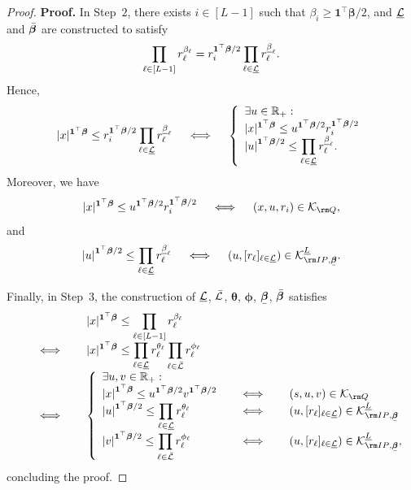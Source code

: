\documentclass[mnsc, nonblindrev]{informswp}
\newcommand{\1}[1]{\mathds{1}{\left(#1\right)}}
\begin{document}
\begin{appendices}
\begin{proof}{\bf Proof.}
In Step~$2$, there exists $i \in [L-1]$ such that $\beta_i \geq \bm 1^\top \bm \beta/2$, and $\underline {\mathcal{L}}$ and $\bar{\bm{\beta}}$ are constructed to satisfy 
$$
\prod_{\ell \in [L-1]} r^{\beta_\ell}_\ell  = r_i^{\bm 1^\top \bm \beta/2}\prod_{\ell \in \underline {\mathcal{L}}} r^{\underline \beta_\ell}_\ell.
$$
Hence,
$$
|x|^{\bm 1^\top \bm \beta} \leq r_i^{\bm 1^\top \bm \beta/2}\prod_{\ell \in \underline {\mathcal{L}}} r^{\underline \beta_\ell}_\ell 
~~~\iff~~~
\left\{
\begin{array}{l}
\exists u \in \mathbb{R}_+:\\
\displaystyle |x|^{\bm 1^\top \bm \beta} \leq {u}^{\bm 1^\top \bm \beta/2} r_i^{\bm 1^\top \bm \beta/2}\\
\displaystyle {|u|}^{\bm 1^\top \bm \beta/2} \leq  \prod_{\ell \in \underline {\mathcal{L}}}r_\ell^{\underline \beta_\ell}.
\end{array}
\right.
$$
Moreover,  we have
$$
|x|^{\bm 1^\top \bm \beta} \leq {u}^{\bm 1^\top \bm \beta/2} r_i^{\bm 1^\top \bm \beta/2} 
~~~\iff~~~
(x,u,r_i) \in \cK_{\rm Q},
$$
and 
$$
{|u|}^{\bm 1^\top \bm \beta/2} \leq  \prod_{\ell \in \underline \cL}r_\ell^{\underline \beta_\ell} 
~~~\iff~~~
(u, [r_\ell]_{\ell \in \underline \cL}) \in \cK^{\underline L}_{{\rm IP},\bmu \beta}.
$$

Finally, in Step~$3$, the construction of $\underline {\mathcal{L}}$, $\bar {\mathcal{L}}$, $\bm \theta$, $\bm \phi$, $\bmu \beta$, $\bar{\bm{\beta}}$ satisfies
$$
\begin{array}{rcl}
&& \displaystyle |x|^{\bm 1^\top \bm \beta} \leq  \prod_{\ell \in [L-1]}r_\ell^{\beta_\ell} \\
&~~~\iff~~~& \displaystyle  
|x|^{\bm 1^\top \bm \beta}  \leq \prod_{\ell \in \underline \cL}r_\ell^{\theta_\ell}\prod_{\ell \in \bar \cL}r_\ell^{\phi_\ell}\\
&~~~\iff~~~&
\left\{
\begin{array}{lcl}
\exists u,v \in \bbr_+:\\
\displaystyle {|x|}^{\bm 1^\top \bm \beta} \leq {u}^{\bm 1^\top \bm \beta/2} {v}^{\bm 1^\top \bm \beta/2} &~~~\iff~~~& (s,u,v) \in \cK_{\rm Q}\\
\displaystyle {|u|}^{\bm 1^\top \bm \beta/2} \leq  \prod_{\ell \in \underline \cL}r_\ell^{\theta_\ell} &~~~\iff~~~& (u, [r_\ell]_{\ell \in \underline \cL}) \in \cK^{\underline L}_{{\rm IP},\bmu \beta} \\
\displaystyle  {|v|}^{\bm 1^\top \bm \beta/2} \leq  \prod_{\ell \in \bar \cL}r_\ell^{\phi_\ell} &~~~\iff~~~& (u, [r_\ell]_{\ell \in \underline \cL}) \in \cK^{\underline L}_{{\rm IP},\bmu \beta},
\end{array}\right.
\end{array}
$$
concluding the proof.
\hfill \Halmos
\end{proof}


\end{appendices}
\end{document}
